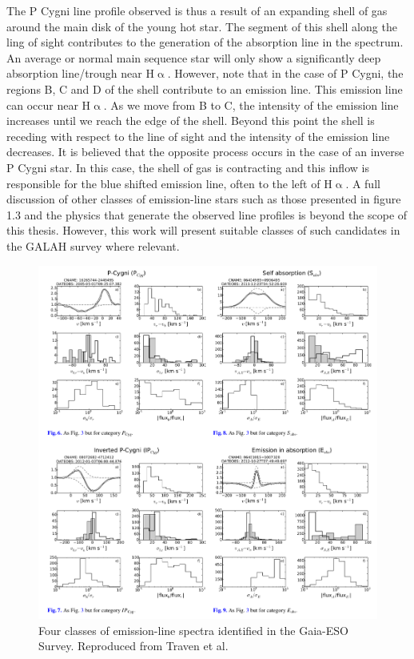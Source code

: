 The P Cygni line profile observed is thus a result of an expanding shell of gas around the main disk of the young hot star. The segment of this shell along the ling of sight contributes to the generation of the absorption line in the spectrum. An average or normal main sequence star will only show a significantly deep absorption line/trough near H$\upalpha$. However, note that in the case of P Cygni, the regions B, C and D of the shell contribute to an emission line. This emission line can occur near H$\upalpha$. As we move from B to C, the intensity of the emission line increases until we reach the edge of the shell. Beyond this point the shell is receding with respect to the line of sight and the intensity of the emission line decreases. It is believed that the opposite process occurs in the case of an inverse P Cygni star. In this case, the shell of gas is contracting and this inflow is responsible for the blue shifted emission line, often to the left of H$\upalpha$. A full discussion of other classes of emission-line stars such as those presented in figure 1.3 and the physics that generate the observed line profiles is beyond the scope of this thesis. However, this work will present suitable classes of such candidates in the GALAH survey where relevant.

\begin{figure}[!htb]
\centering
\includegraphics[scale=.48]{figures/p cygni and inverse p cygni.png}
\caption{Four classes of emission-line spectra identified in the Gaia-ESO Survey. Reproduced from Traven et al.\cite{traven2015gaia}}
\end{figure}

